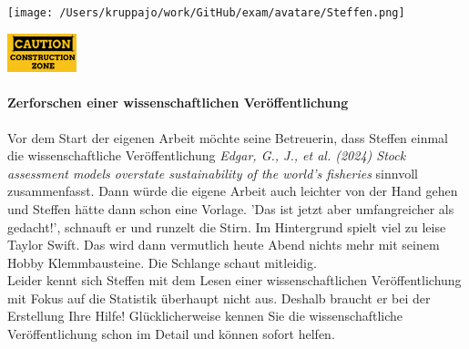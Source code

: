 \documentclass[a4paper, 9pt]{scrartcl}\usepackage[]{graphicx}\usepackage[]{xcolor}
\begin{document}
 
\ifcollection
\begin{flushright}
\tiny\vspace{-3Ex}
\textbf{\examinhaltstart}
\exammodulebiostat
\vspace{-4Ex}
\end{flushright}
\begin{minipage}[t]{0.5\textwidth}
\texttt{[image: /Users/kruppajo/work/GitHub/exam/avatare/Steffen.png]}
\end{minipage}
\begin{minipage}[t]{0.5\textwidth}
\hfill
\href{https://youtu.be/C9skfFRTHhI}{\includegraphics[width = 2cm]{img/caution}}
\end{minipage}
\fi



\ifcollection
\paragraph{Zerforschen einer wissenschaftlichen Veröffentlichung}
\fi

Vor dem Start der eigenen Arbeit möchte seine Betreuerin, dass Steffen einmal die wissenschaftliche Veröffentlichung \textit{Edgar, G., J., et al. (2024) Stock assessment models overstate sustainability of the world’s fisheries} sinnvoll zusammenfasst. Dann würde die eigene Arbeit auch leichter von der Hand gehen und Steffen hätte dann schon eine Vorlage. 'Das ist jetzt aber umfangreicher als gedacht!', schnauft er und runzelt die Stirn. Im Hintergrund spielt viel zu leise Taylor Swift. Das wird dann vermutlich heute Abend nichts mehr mit seinem Hobby Klemmbausteine. Die Schlange schaut mitleidig.\\

Leider kennt sich Steffen mit dem Lesen einer wissenschaftlichen Veröffentlichung mit Fokus auf die Statistik überhaupt nicht aus. Deshalb braucht er bei der Erstellung Ihre Hilfe! Glücklicherweise kennen Sie die wissenschaftliche Veröffentlichung schon im Detail und können sofort helfen.
\end{document}
